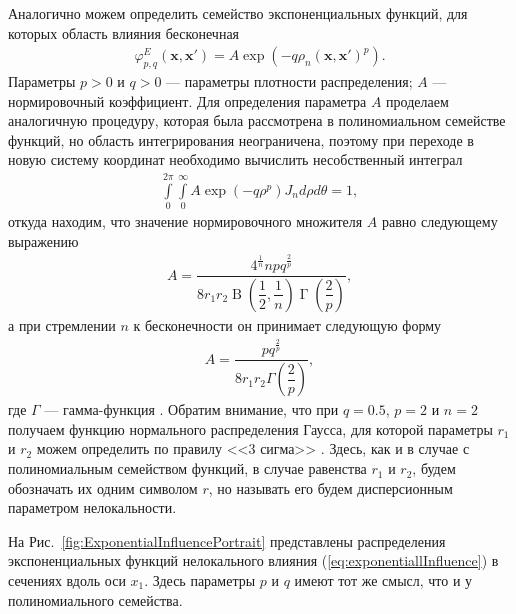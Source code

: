 Аналогично можем определить семейство экспоненциальных функций, для которых область влияния бесконечная
\begin{gather}
	\label{eq:exponentiallInfluence}
	\varphi_{p,q}^{E} (\boldsymbol{x}, \boldsymbol{x}') =
	A \exp \left(-q\rho_n(\boldsymbol{x}, \boldsymbol{x}')^p \right).
\end{gather}
Параметры $p > 0$ и $q > 0$ --- параметры плотности распределения; $A$ --- нормировочный коэффициент. Для определения параметра $A$ проделаем аналогичную процедуру, которая была рассмотрена в полиномиальном семействе функций, но область интегрирования неограничена, поэтому при переходе в новую систему координат необходимо вычислить несобственный интеграл
\begin{gather*}
	\int\limits_0^{2\pi}
		\int\limits_0^{\infty}
			A \exp \left(-q\rho^p \right) J_n
		d \rho
	d \theta = 1,
\end{gather*}
откуда находим, что значение нормировочного множителя $A$ равно следующему выражению
\begin{gather*}
	\label{eq:normExp}
	A = 
	\dfrac
	{
		4^{\frac{1}{n}} n p q^{\frac{2}{p}}
	}
	{
		8 r_1 r_2 \operatorname{B} \left( \dfrac{1}{2}, \dfrac{1}{n} \right) \operatorname{\Gamma} \left( \dfrac{2}{p} \right)
	},
\end{gather*}
а при стремлении $n$ к бесконечности он принимает следующую форму
\begin{gather*}
	A = \dfrac{p q^{\frac{2}{p}}}{8 r_1 r_2 \Gamma \left( \dfrac{2}{p} \right)},
\end{gather*}
где $\Gamma$ --- гамма-функция \cite{SpecialFunction}. Обратим внимание, что при $q = 0.5$, $p = 2$ и $n = 2$ получаем функцию нормального распределения Гаусса, для которой параметры $r_1$ и $r_2$ можем определить по правилу <<3 сигма>> \cite{TeorVer}. Здесь, как и в случае с полиномиальным семейством функций, в случае равенства $r_1$ и $r_2$, будем обозначать их одним символом $r$, но называть его будем дисперсионным параметром нелокальности.

На Рис.~\ref{fig:ExponentialInfluencePortrait} представлены распределения экспоненциальных функций нелокального влияния (\ref{eq:exponentiallInfluence}) в сечениях вдоль оси $x_1$. Здесь параметры $p$ и $q$ имеют тот же смысл, что и у полиномиального семейства.


